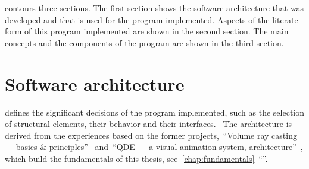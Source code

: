 \documentclass[%
    a4paper,    %
    justified,  %
    nobib,      %
    openany     %
]{tufte-book}
\makeatletter
\renewcommand{\label}[1]{\@tufte@label{##1}}%
\makeatother
\begin{document}
 contours three sections. The first section shows the
software architecture that was developed and that is used for the program
implemented. Aspects of the literate form of this program implemented are shown
in the second section. The main concepts and the components of the program are
shown in the third section.

%
%
%


\section{Software architecture}
\label{results:sec:software-architecture}

 defines the significant decisions of the
program implemented, such as the selection of structural elements, their
behavior and their interfaces.~\cite{kruchten_rup_2003} The architecture is
derived from the experiences based on the former projects,~\enquote{Volume ray
casting --- basics \& principles}~\cite{osterwalder-volume-2016}
and~\enquote{QDE --- a visual animation system,
architecture}~\cite{osterwalder-qde-2016}, which build the fundamentals of this
thesis, see~\autoref{chap:fundamentals}~\enquote{}.
\end{document}
